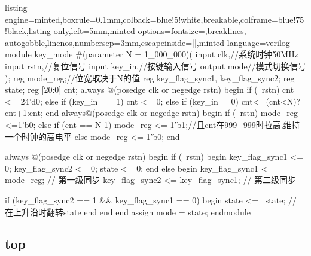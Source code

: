 \documentclass[a4paper]{article}
\begin{document}
\begin{tcblisting}{listing engine=minted,boxrule=0.1mm,colback=blue!5!white,breakable,colframe=blue!75!black,listing only,left=5mm,minted options={fontsize=\small,breaklines, autogobble,linenos,numbersep=3mm,escapeinside=||},minted language=verilog}
    module key_mode #(parameter N = 1_000_000)(
        input clk,//系统时钟50MHz
        input rstn,//复位信号
        input key_in,//按键输入信号
        output mode//模式切换信号
    );
        reg mode_reg;//位宽取决于N的值
        reg key_flag_sync1, key_flag_sync2;
        reg state;
        reg [20:0] cnt;
        always @(posedge clk or negedge rstn) begin
            if (~rstn) cnt <= 24'd0;
            else if (key_in == 1) cnt <= 0;
            else if (key_in==0) cnt<=(cnt<N)?cnt+1:cnt;
            end
        always@(posedge clk or negedge rstn) begin
            if (~rstn) mode_reg <=1'b0;
            else if (cnt == N-1) mode_reg <= 1'b1;//且cnt在999_999时拉高,维持一个时钟的高电平
            else mode_reg <= 1'b0;
        end

        always @(posedge clk or negedge rstn) begin
            if (~rstn) begin
                key_flag_sync1 <= 0;
                key_flag_sync2 <= 0;
                state <= 0;
            end else begin
                key_flag_sync1 <= mode_reg;  // 第一级同步
                key_flag_sync2 <= key_flag_sync1;  // 第二级同步

                if (key_flag_sync2 == 1 && key_flag_sync1 == 0) begin
                    state <= ~state;  // 在上升沿时翻转state
                end
            end
        end
        assign mode = state;
    endmodule
\end{tcblisting}

\subsection{top}
\end{document}
